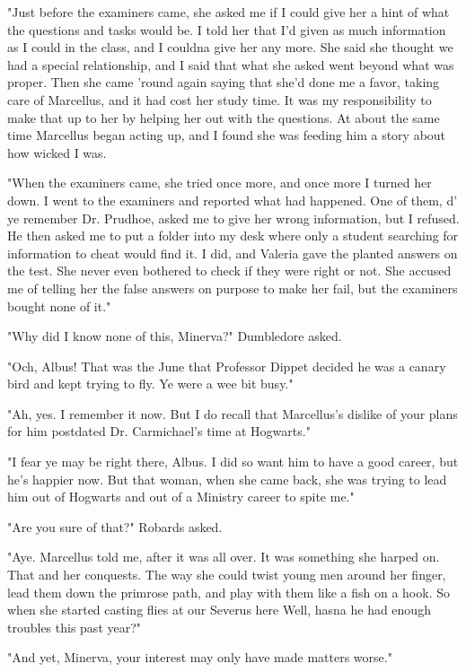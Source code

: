 "Just before the examiners came, she asked me if I could give her a hint of what the questions and tasks would be. I told her that I'd given as much information as I could in the class, and I couldna give her any more. She said she thought we had a special relationship, and I said that what she asked went beyond what was proper. Then she came 'round again saying that she'd done me a favor, taking care of Marcellus, and it had cost her study time. It was my responsibility to make that up to her by helping her out with the questions. At about the same time Marcellus began acting up, and I found she was feeding him a story about how wicked I was.

"When the examiners came, she tried once more, and once more I turned her down. I went to the examiners and reported what had happened. One of them, d' ye remember Dr. Prudhoe, asked me to give her wrong information, but I refused. He then asked me to put a folder into my desk where only a student searching for information to cheat would find it. I did, and Valeria gave the planted answers on the test. She never even bothered to check if they were right or not. She accused me of telling her the false answers on purpose to make her fail, but the examiners bought none of it."

"Why did I know none of this, Minerva?" Dumbledore asked.

"Och, Albus! That was the June that Professor Dippet decided he was a canary bird and kept trying to fly. Ye were a wee bit busy."

"Ah, yes. I remember it now. But I do recall that Marcellus's dislike of your plans for him postdated Dr. Carmichael's time at Hogwarts."

"I fear ye may be right there, Albus. I did so want him to have a good career, but he's happier now. But that woman, when she came back, she was trying to lead him out of Hogwarts and out of a Ministry career to spite me."

"Are you sure of that?" Robards asked.

"Aye. Marcellus told me, after it was all over. It was something she harped on. That and her conquests. The way she could twist young men around her finger, lead them down the primrose path, and play with them like a fish on a hook. So when she started casting flies at our Severus here{\el} Well, hasna he had enough troubles this past year?"

"And yet, Minerva, your interest may only have made matters worse."

